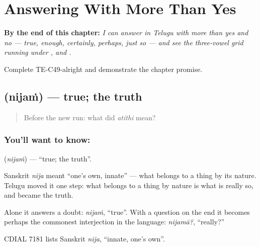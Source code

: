 
\chapter{Answering With More Than Yes}
\label{ch:te-replies}

\begin{chapteropening}
\textbf{By the end of this chapter:} \emph{I can answer in Telugu with more than yes and no --- true, enough, certainly, perhaps, just so --- and see the three-vowel grid running under ,  and .}

Complete TE-C49-alright and demonstrate the chapter promise.
\end{chapteropening}

\section[\texorpdfstring{\te{నిజం} (nijaṁ)}{నిజం (nijaṁ)}]{ (nijaṁ) — true; the truth}

\label{lesson:TE-C49-true}



\begin{quote}
Before the new run: what did \emph{atithi} mean?
\end{quote}

\subsection*{You'll want to know: }
\textbf{} (\emph{nijaṁ}) — \textquotedblleft{}true; the truth\textquotedblright{}.

Sanskrit \emph{nija} meant \textquotedblleft{}one's own, innate\textquotedblright{} — what belongs to a thing by its nature. Telugu moved it one step: what belongs to a thing by nature is what is really so, and  became the truth.

Alone it answers a doubt: \emph{nijaṁ}, \textquotedblleft{}true\textquotedblright{}. With a question on the end it becomes perhaps the commonest interjection in the language: \emph{nijamā?}, \textquotedblleft{}really?\textquotedblright{}

CDIAL 7181 lists Sanskrit \emph{nija}, \textquotedblleft{}innate, one's own\textquotedblright{}.

